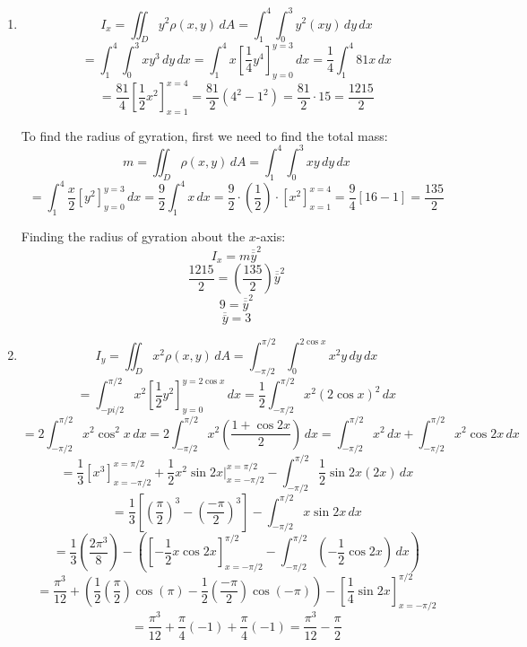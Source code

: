 \begin{Answer}[ref = moment]
\begin{enumerate}
\item $$I_x = \iint_{\textit{D}} y^2 \rho(x, y)\,dA = \int_1^4 \int_0^3 y^2 (xy
) \,dy\,dx$$
$$= \int_1^4 \int_0^3 xy^3\,dy\,dx = \int_1^4 x \left[ \frac{1}{4} y^4 \right]_
{y = 0}^{y = 3}\,dx = \frac{1}{4} \int_1^4 81x\,dx$$
$$= \frac{81}{4} \left[ \frac{1}{2} x^2 \right]_{x = 1}^{x = 4} = \frac{81}{2} 
\left(4^2 - 1^2 \right) = \frac{81}{2} \cdot 15 = \frac{1215}{2}$$

To find the radius of gyration, first we need to find the total mass:
$$m = \iint_{\textit{D}} \rho(x, y)\,dA = \int_1^4 \int_0^3 xy\,dy\,dx$$
$$= \int_1^4 \frac{x}{2} \left[y^2 \right]_{y = 0}^{y = 3} \,dx = \frac{9}{2} 
\int_1^4 x\,dx = \frac{9}{2} \cdot \left( \frac{1}{2} \right) \cdot \left[x^2 
\right]_{x = 1}^{x = 4} = \frac{9}{4} \left[16 - 1 \right] = \frac{135}{2}$$

Finding the radius of gyration about the $x$-axis:
$$I_x = m\overline{\overline{y}}^2$$
$$\frac{1215}{2} = \left( \frac{135}{2} \right) \overline{\overline{y}}^2$$
$$9 = \overline{\overline{y}}^2$$
$$\overline{\overline{y}} = 3$$

\item $$I_y = \iint_{\textit{D}} x^2 \rho(x, y)\,dA = \int_{-\pi/2}^{\pi/2} 
\int_0^{2\cos{x}} x^2y\,dy\,dx$$
$$= \int_{-pi/2}^{\pi/2} x^2 \left[ \frac{1}{2}y^2 \right]_{y = 0}^{y = 2\cos{x
}}\,dx = \frac{1}{2} \int_{-\pi/2}^{\pi/2} x^2 \left(2\cos{x} \right)^2\,dx$$
$$= 2 \int_{-\pi/2}^{\pi/2} x^2 \cos^2{x}\,dx = 2\int_{-\pi/2}^{\pi/2} x^2 
\left( \frac{1 + \cos{2x}}{2} \right)\,dx = \int_{-\pi/2}^{\pi/2}x^2\,dx + \int
_{-\pi/2}^{\pi/2} x^2 \cos{2x} \,dx$$
$$= \frac{1}{3} \left[ x^3 \right]_{x = -\pi/2}^{x = \pi/2} + \frac{1}{2}x^2
\sin{2x}|_{x = -\pi/2}^{x = \pi/2} - \int_{-\pi/2}^{\pi/2} \frac{1}{2}\sin{2x} 
\left(2x \right)\,dx$$
$$= \frac{1}{3} \left[ \left( \frac{\pi}{2} \right)^3 - \left( \frac{-\pi}{2} 
\right)^3 \right] - \int_{-\pi/2}^{\pi/2} x \sin{2x}\,dx$$
$$ = \frac{1}{3} \left( \frac{2\pi^3}{8} \right) - \left( \left[ -\frac{1}{2}x
\cos{2x} \right]_{x = -\pi/2}^{\pi/2} - \int_{-\pi/2}^{\pi/2} (-\frac{1}{2}
\cos{2x}) \,dx\right)$$
$$ = \frac{\pi^3}{12} + \left( \frac{1}{2} \left( \frac{\pi}{2} \right) \cos{(
\pi)} - \frac{1}{2} \left( \frac{-\pi}{2} \right) \cos{(-\pi)} \right) - \left[
\frac{1}{4} \sin{2x} \right]_{x = -\pi/2}^{\pi/2}$$
$$= \frac{\pi^3}{12} + \frac{\pi}{4}(-1) + \frac{\pi}{4}(-1) = \frac{\pi^3}{12}
- \frac{\pi}{2}$$


\end{enumerate}
\end{Answer}
